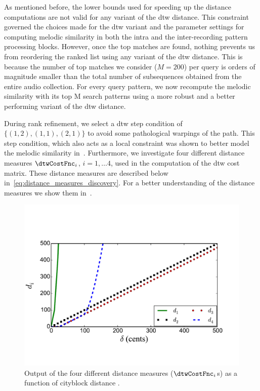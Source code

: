 As mentioned before, the lower bounds used for speeding up the distance computations are not valid for any variant of the \gls{dtw} distance. This constraint governed the choices made for the \gls{dtw} variant and the parameter settings for computing melodic similarity in both the intra and the inter-recording pattern processing blocks. However, once the top matches are found, nothing prevents us from reordering the ranked list using any variant of the \gls{dtw} distance. This is because the number of top matches we consider ($M=200$) per query is orders of magnitude smaller than the total number of subsequences obtained from the entire audio collection. For every query pattern, we now recompute the melodic similarity with its top M search patterns using a more robust and a better performing variant of the \gls{dtw} distance.

During rank refinement, we select a \gls{dtw} step condition of $\lbrace(1,2), (1,1), (2,1)\rbrace$ to avoid some pathological warpings of the path. This step condition, which also acts as a local constraint was shown to better model the melodic similarity in~. Furthermore, we investigate four different distance measures $\dtwCostFnc_i$, $i=1,\dots 4$, used in the computation of the \gls{dtw} cost matrix. These distance measures are described below in~\eqref{eq:distance_measures_discovery}. For a better understanding of the distance measures we show them in~.


\begin{figure}
	\begin{center}
		\includegraphics[width=\figSizeEightyFive]{ch06_patterns/figures/discovery/distances.pdf}
	\end{center}
	\caption{Output of the four different distance measures ($\dtwCostFnc_i$s) as a function of cityblock distance \pitchDiff.}
	\label{fig:Distances_DTW_discovery}
\end{figure}


